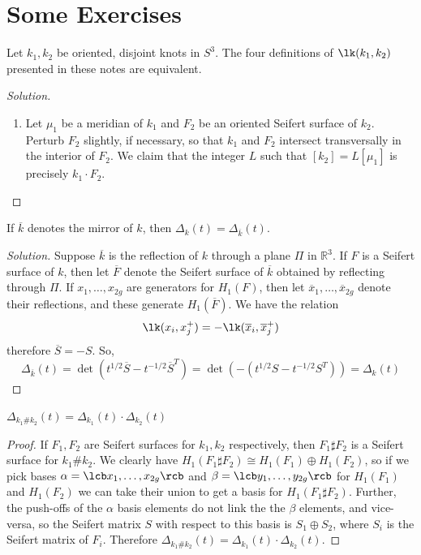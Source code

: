 \newpage
\section{Some Exercises}


\begin{exercise}
Let $k_1,k_2$ be oriented, disjoint knots in $S^3$. The four definitions of $\lk(k_1,k_2)$ presented in these notes are equivalent.
\end{exercise}
\begin{proof}[Solution]
\sloppyspace
\begin{enumerate}
	\item Let $\mu_1$ be a meridian of $k_1$ and $F_2$ be an oriented Seifert surface of $k_2$. Perturb $F_2$ slightly, if necessary, so that $k_1$ and $F_2$ intersect transversally in the interior of $F_2$. We claim that the integer $L$ such that $[k_2] = L [\mu_1]$ is precisely $k_1 \cdot F_2$. 
\end{enumerate}
\end{proof}



\begin{exercise}
If $\overline{k}$ denotes the mirror of $k$, then $\Delta_k(t) = \Delta_{\overline k}(t)$.
\end{exercise}
\begin{proof}[Solution]
Suppose $\overline k$ is the reflection of $k$ through a plane $\Pi$ in $\mathbb R^3$. If $F$ is a Seifert surface of $k$, then let $\overline F$ denote the Seifert surface of $\overline k$ obtained by reflecting through $\Pi$. If $x_1,\ldots,x_{2g}$ are generators for $H_1(F)$, then let $\overline x_1,\ldots,\overline x_{2g}$ denote their reflections, and these generate $H_1(\overline F)$. We have the relation
\[ \lk(x_i,x_j^+) = -\lk(\overline x_i,\overline x_j^+) \]
therefore $\overline S = -S$. So, 
\[ \Delta_{\overline k}(t) = \det(t^{1/2}\overline S-t^{-1/2}\overline S^T) = \det(-(t^{1/2}S-t^{-1/2}S^T)) = \Delta_k(t) \]
\end{proof}



\begin{exercise}
$\Delta_{k_1 \# k_2}(t) = \Delta_{k_1}(t) \cdot \Delta_{k_2}(t)$
\end{exercise}
\begin{proof}
If $F_1,F_2$ are Seifert surfaces for $k_1,k_2$ respectively, then $F_1 \sharp F_2$ is a Seifert surface for $k_1 \# k_2$. We clearly have $H_1(F_1 \sharp F_2) \cong H_1(F_1) \oplus H_1(F_2)$, so if we pick bases $\alpha = \lcb x_1,\ldots,x_{2g} \rcb$ and $\beta = \lcb y_1,\ldots,y_{2g} \rcb$ for $H_1(F_1)$ and $H_1(F_2)$ we can take their union to get a basis for $H_1(F_1 \sharp F_2)$. Further, the push-offs of the $\alpha$ basis elements do not link the the $\beta$ elements, and vice-versa, so the Seifert matrix $S$ with respect to this basis is $S_1 \oplus S_2$, where $S_i$ is the Seifert matrix of $F_i$. Therefore $\Delta_{k_1 \# k_2}(t) = \Delta_{k_1}(t) \cdot \Delta_{k_2}(t)$.
\end{proof}



